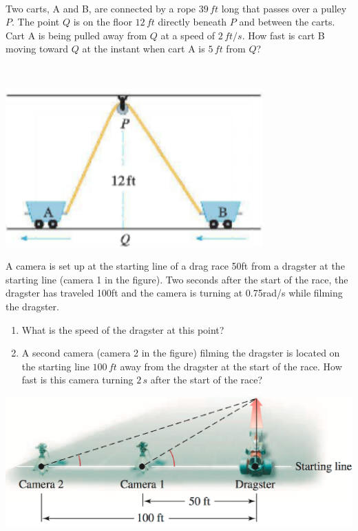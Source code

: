 \documentclass[answers]{exam}
\begin{document}
\noindent
\begin{minipage}[t]{0.7\linewidth}~
  \begin{ex*}
  Two carts, A and B, are connected by a rope $39\,ft$ long that passes over a pulley $P$. The point $Q$ is on the floor $12\,ft$ directly beneath $P$ and between the carts.  Cart A is being pulled away from $Q$ at  a speed of $2\,ft/s$.  How fast is cart B moving toward $Q$ at the instant when cart A is $5\,ft$ from $Q$?
\end{ex*}
\end{minipage}%
\begin{minipage}[t]{0.3\linewidth}~
  \begin{flushright}
    \vspace*{7.5pt}
    \includegraphics[width=0.9\linewidth]{images/briggs_03_11/cart.png}
  \end{flushright}
\end{minipage}%
\pagebreak

\begin{ex*}
   A camera is set up at the starting line of a drag race 50ft from a dragster at the starting line (camera 1 in the figure). Two seconds after the start of the race, the dragster has traveled 100ft and the camera is turning at 0.75rad/s while filming the dragster.
  \begin{enumerate}[label=\alph*)]
    \item What is the speed of the dragster at this point?
    \item A second camera (camera 2 in the figure) filming the dragster is located on the starting line $100\,ft$ away from the dragster at the start of the race. How fast is this camera turning $2\,s$ after the start of the race?
  \end{enumerate}
\end{ex*}
\vspace*{-20pt}
\begin{flushright}
  \includegraphics[width=0.5\linewidth]{images/briggs_03_11/dragrace.png}
\end{flushright}
\pagebreak
\end{document}
